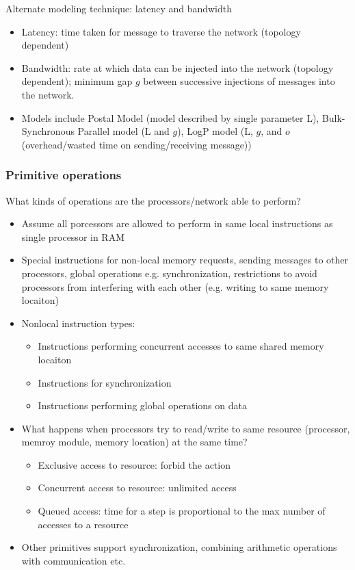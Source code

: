 Alternate modeling technique: latency and bandwidth
\begin{itemize}
    \item Latency: time taken for message to traverse the network (topology dependent)
    \item Bandwidth: rate at which data can be injected into the network (topology dependent); minimum gap $g$ between successive injections of messages into the network. 
    \item Models include Postal Model (model described by single parameter L), Bulk-Synchronous Parallel model (L and $g$), LogP model (L, $g$, and $o$ (overhead/wasted time on sending/receiving message))
\end{itemize}

\subsubsection{Primitive operations}

What kinds of operations are the processors/network able to perform? 
\begin{itemize}
    \item Assume all porcessors are allowed to perform in same local instructions as single processor in RAM
    \item Special instructions for non-local memory requests, sending messages to other processors, global operations e.g. synchronization, restrictions to avoid processors from interfering with each other (e.g. writing to same memory locaiton)
    \item Nonlocal instruction types:
    \begin{itemize}
        \item Instructions performing concurrent accesses to same shared memory locaiton
        \item Instructions for synchronization
        \item Instructions performing global operations on data
    \end{itemize}
    \item What happens when processors try to read/write to same resource (processor, memroy module, memory location) at the same time? 
    \begin{itemize}
        \item Exclusive access to resource: forbid the action
        \item Concurrent access to resource: unlimited access
        \item Queued access: time for a step is proportional to the max number of accesses to a resource
    \end{itemize}
    \item Other primitives support synchronization, combining arithmetic operations with communication etc.
\end{itemize}


